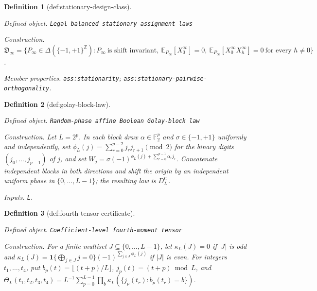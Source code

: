 \documentclass{article}
\newtheorem{definition}{Definition}
\begin{document}
\begin{definition}[def:stationary-design-class]\label{def:stationary-design-class}
\par\smallskip\noindent\emph{Defined object.} \texttt{Legal balanced stationary assignment laws}
\par\smallskip\noindent\emph{Construction.} \(\mathfrak D_{\infty}=\{P_{\infty}\in\Delta(\{-1,+1\}^{\mathbb Z}):P_{\infty}\ \text{is shift invariant},\ \mathbb E_{P_{\infty}}[X_0^{\infty}]=0,\ \mathbb E_{P_{\infty}}[X_0^{\infty}X_h^{\infty}]=0\ \text{for every }h\ne0\}\).
\par\smallskip\noindent\emph{Member properties.} \texttt{ass:\allowbreak{}stationarity}; \texttt{ass:\allowbreak{}stationary-\allowbreak{}pairwise-\allowbreak{}orthogonality}.
\end{definition}

\begin{definition}[def:golay-block-law]\label{def:golay-block-law}
\par\smallskip\noindent\emph{Defined object.} \texttt{Random-\allowbreak{}phase affine Boolean Golay-\allowbreak{}block law}
\par\smallskip\noindent\emph{Construction.} Let \(L=2^p\). In each block draw \(\alpha\in\mathbb F_2^p\) and \(\sigma\in\{-1,+1\}\) uniformly and independently, set \(\phi_L(j)=\sum_{r=0}^{p-2}j_rj_{r+1}\pmod 2\) for the binary digits \((j_0,\ldots,j_{p-1})\) of \(j\), and set \(W_j=\sigma(-1)^{\phi_L(j)+\sum_{r=0}^{p-1}\alpha_rj_r}\). Concatenate independent blocks in both directions and shift the origin by an independent uniform phase in \(\{0,\ldots,L-1\}\); the resulting law is \(D_L^{\mathrm G}\).
\par\smallskip\noindent\emph{Inputs.} \texttt{L}.
\end{definition}

\begin{definition}[def:fourth-tensor-certificate]\label{def:fourth-tensor-certificate}
\par\smallskip\noindent\emph{Defined object.} \texttt{Coefficient-\allowbreak{}level fourth-\allowbreak{}moment tensor}
\par\smallskip\noindent\emph{Construction.} For a finite multiset \(J\subseteq\{0,\ldots,L-1\}\), let \(\kappa_L(J)=0\) if \(|J|\) is odd and \(\kappa_L(J)=\mathbf 1\{\bigoplus_{j\in J}j=0\}(-1)^{\sum_{j\in J}\phi_L(j)}\) if \(|J|\) is even. For integers \(t_1,\ldots,t_4\), put \(b_p(t)=\lfloor(t+p)/L\rfloor\), \(j_p(t)=(t+p)\bmod L\), and \(\Theta_L(t_1,t_2,t_3,t_4)=L^{-1}\sum_{p=0}^{L-1}\prod_b\kappa_L(\{j_p(t_r):b_p(t_r)=b\})\).
\end{definition}
\end{document}
